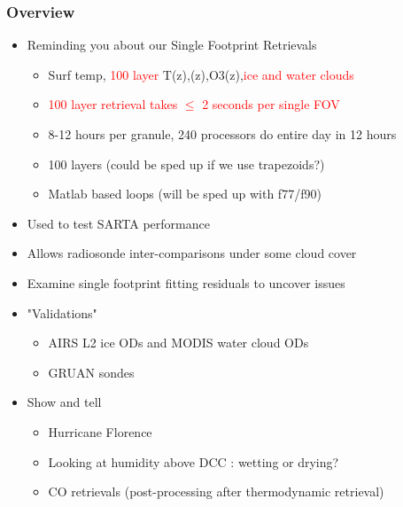 \documentclass[10pt,t]{beamer}
\begin{document}
\begin{frame}
  \frametitle{Overview}

  \begin{itemize}
  \item Reminding you about our Single Footprint Retrievals
    \begin{itemize}
    \item Surf temp, \textcolor{red}{100 layer}
      T(z),\water(z),O3(z),\textcolor{red}{ice and water clouds}    
    \item \textcolor{red}{100 layer retrieval takes $\le$ 2 seconds per
        single FOV}    
    \item 8-12 hours per granule, 240 processors do entire day in 12 hours
    \item 100 layers (could be sped up if we use trapezoids?)
    \item Matlab based loops (will be sped up with f77/f90)
    \end{itemize}
  \item Used to test SARTA performance
  \item Allows radiosonde inter-comparisons under some cloud cover
  \item Examine single footprint fitting residuals to uncover issues
  \item "Validations"
    \begin{itemize}
    \item AIRS L2 ice ODs and MODIS water cloud ODs
    \item GRUAN sondes
    \end{itemize}
  \item Show and tell
    \begin{itemize}
    \item Hurricane Florence
    \item Looking at humidity above DCC : wetting or drying?
    \item CO retrievals (post-processing after thermodynamic retrieval)
    \end{itemize}
  \end{itemize}
\end{frame}
\end{document}
